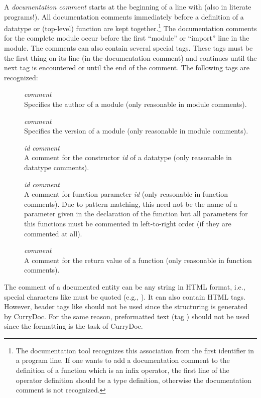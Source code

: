 A \emph{documentation comment}
starts at the beginning of a line
with \ccode{--- }\pindex{---} (also in literate programs!).
All documentation comments immediately before a
definition of a datatype or (top-level) function are kept together.\footnote{%
The documentation tool recognizes this association from the first identifier
in a program line. If one wants to add a documentation comment
to the definition of a function which is an infix operator,
the first line of the operator definition should be a type definition,
otherwise the documentation comment is not recognized.}
The documentation comments for the complete module occur before
the first ``module'' or ``import'' line in the module.
The comments can also contain several special tags. These tags
must be the first thing on its line (in the documentation comment)
and continues until the next tag is encountered or until the
end of the comment. The following tags are recognized:
\begin{description}
\item[] \emph{comment}\\
Specifies the author of a module (only reasonable in module comments).
\item[] \emph{comment}\\
Specifies the version of a module (only reasonable in module comments).
\item[] \emph{id} \emph{comment}\\
A comment for the constructor \emph{id} of a datatype
(only reasonable in datatype comments).
\item[] \emph{id} \emph{comment}\\
A comment for function parameter \emph{id}
(only reasonable in function comments).
Due to pattern matching, this need not be the name of a parameter
given in the declaration of the function but all parameters
for this functions must be commented in left-to-right order
(if they are commented at all).
\item[] \emph{comment}\\
A comment for the return value of a function
(only reasonable in function comments).
\end{description}
The comment of a documented entity can be any string
in HTML format, i.e., special characters like \ccode{<}
must be quoted (e.g., ).
It can also contain HTML tags.
However, header tags like  should not be used
since the structuring is generated by CurryDoc.
For the same reason, preformatted text (tag )
should not be used since the formatting is the task of CurryDoc.

